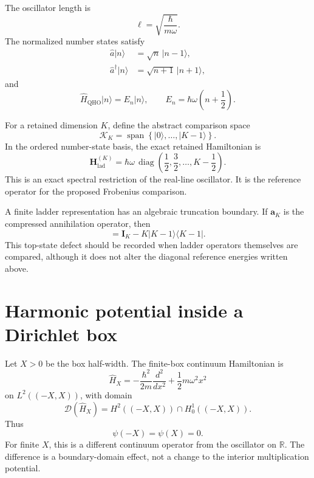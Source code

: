 The oscillator length is
\begin{equation}
    \ell
    =
    \sqrt{\frac{\hbar}{m\omega}}.
\end{equation}
The normalized number states satisfy
\begin{align}
    \hat a\lvert n\rangle
    &=
    \sqrt{n}\,\lvert n-1\rangle,
    \\
    \hat a^\dagger\lvert n\rangle
    &=
    \sqrt{n+1}\,\lvert n+1\rangle,
\end{align}
and
\begin{equation}
    \hat H_{\mathrm{QHO}}\lvert n\rangle
    =
    E_n\lvert n\rangle,
    \qquad
    E_n
    =
    \hbar\omega
    \left(n+\frac{1}{2}\right).
\end{equation}

For a retained dimension $K$, define the abstract comparison space
\begin{equation}
    \mathcal K_K
    =
    \operatorname{span}
    \left\{
        \lvert 0\rangle,\ldots,\lvert K-1\rangle
    \right\}.
\end{equation}
In the ordered number-state basis, the exact retained Hamiltonian is
\begin{equation}
    \mathbf H_{\mathrm{lad}}^{(K)}
    =
    \hbar\omega\,
    \operatorname{diag}
    \left(
        \frac{1}{2},
        \frac{3}{2},
        \ldots,
        K-\frac{1}{2}
    \right).
\end{equation}
This is an exact spectral restriction of the real-line oscillator. It is the
reference operator for the proposed Frobenius comparison.

A finite ladder representation has an algebraic truncation boundary. If
$\mathbf a_K$ is the compressed annihilation operator, then
\begin{equation}
    [\mathbf a_K,\mathbf a_K^\dagger]
    =
    \mathbf I_K
    -
    K\lvert K-1\rangle\langle K-1\rvert.
\end{equation}
This top-state defect should be recorded when ladder operators themselves are
compared, although it does not alter the diagonal reference energies written
above.

\section*{Harmonic potential inside a Dirichlet box}

Let $X>0$ be the box half-width. The finite-box continuum Hamiltonian is
\begin{equation}
    \hat H_X
    =
    -\frac{\hbar^2}{2m}\frac{d^2}{dx^2}
    +
    \frac{1}{2}m\omega^2x^2
\end{equation}
on $L^2((-X,X))$, with domain
\begin{equation}
    \mathcal D(\hat H_X)
    =
    H^2((-X,X))\cap H_0^1((-X,X)).
\end{equation}
Thus
\begin{equation}
    \psi(-X)=\psi(X)=0.
\end{equation}
For finite $X$, this is a different continuum operator from the oscillator on
$\mathbb R$. The difference is a boundary-domain effect, not a change to the
interior multiplication potential.

